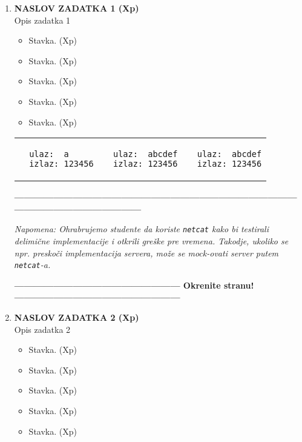 \documentclass[]{article}
\begin{document}
\begin{enumerate}

  \item \textbf{NASLOV ZADATKA 1 (Xp)}
  \\Opis zadatka 1
  \begin{itemize}
    \item Stavka. \hfill (Xp)
    \item Stavka. \hfill (Xp)
    \item Stavka. \hfill (Xp)
    \item Stavka. \hfill (Xp)
    \item Stavka. \hfill (Xp)
  \end{itemize}

  \noindent
  \begin{tabular}{lll}
  \begin{lstlisting}
  ulaz:  a
  izlaz: 123456
  \end{lstlisting}&
  \begin{lstlisting}
  ulaz:  abcdef
  izlaz: 123456
  \end{lstlisting}&
  \begin{lstlisting}
  ulaz:  abcdef
  izlaz: 123456
  \end{lstlisting}
  \end{tabular} 
\vspace{15pt}
\begin{center}
  \textbf{------------------------------------------------------------------------------------------------------------------------------}
\end{center}
\textit{Napomena: Ohrabrujemo studente da koriste \texttt{netcat} kako bi testirali delimi\v{c}ne implementacije i otkrili gre\v{s}ke pre vremena. Takodje, ukoliko se npr. presko\v{c}i implementacija servera, mo\v{z}e se mock-ovati server putem \texttt{netcat}-a.} 
\begin{center}
  \textbf{--------------------------------------------------- Okrenite stranu! ---------------------------------------------------}
\end{center}
\newpage
  \item \textbf{NASLOV ZADATKA 2 (Xp)}
  \\Opis zadatka 2
  \begin{itemize}
    \item Stavka. \hfill (Xp)
    \item Stavka. \hfill (Xp)
    \item Stavka. \hfill (Xp)
    \item Stavka. \hfill (Xp)
    \item Stavka. \hfill (Xp)
  \end{itemize}
  

\end{enumerate}
\end{document}

